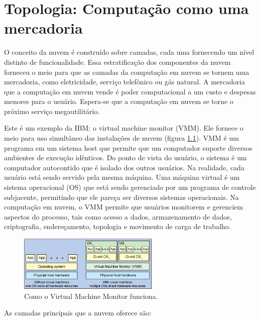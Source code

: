 \chapter{Topologia: Computação como uma mercadoria}

O conceito da nuvem é construído sobre camadas, cada uma fornecendo um nível
distinto de funcionalidade. Essa estratificação dos componentes da nuvem forneceu o
meio para que as camadas da computação em nuvem se tornem uma mercadoria, como
eletricidade, serviço telefônico ou gás natural. A mercadoria que a computação em
nuvem vende é poder computacional a um custo e despesas menores para o usuário.
Espera-se que a computação em nuvem se torne o próximo serviço megautilitário.

Este é um exemplo da IBM: o virtual machine monitor (VMM). Ele fornece o meio para
uso simultâneo das instalações de nuvem (figura \ref{fig:vmm}). VMM é um programa em
um sistema host que permite que um computador suporte diversos ambientes de execução
idênticos. Do ponto de vista do usuário, o sistema é um computador autocontido que
é isolado dos outros usuários. Na realidade, cada usuário está sendo servido pela
mesma máquina. Uma máquina virtual é um sistema operacional (OS) que está sendo
gerenciado por um programa de controle subjacente, permitindo que ele pareça ser
diversos sistemas operacionais. Na computação em nuvem, o VMM permite que usuários
monitorem e gerenciem aspectos do processo, tais como acesso a dados, armazenamento
de dados, criptografia, endereçamento, topologia e movimento de carga de trabalho. 


\begin{figure}[ht]
    \centering
    \includegraphics[width=0.6\textwidth]{img/vmm.png}
    \caption{Como o Virtual Machine Monitor funciona.}
    \label{fig:vmm}
\end{figure}


As camadas principais que a nuvem oferece são:

\newcommand{\itemm}[1]{\item\textbf{#1}}

